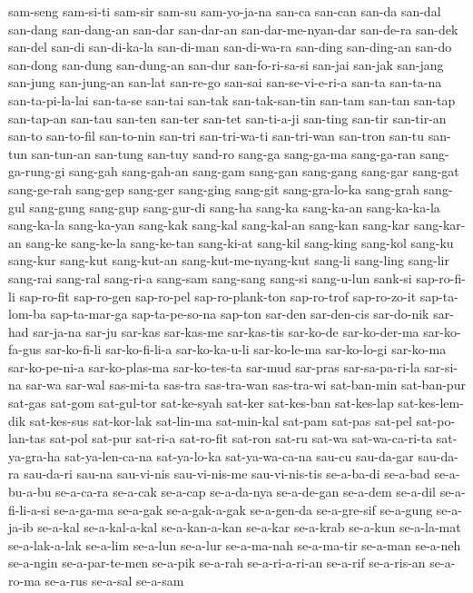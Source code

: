 {sam-seng sam-si-ti sam-sir sam-su sam-yo-ja-na san-ca san-can san-da
san-dal san-dang san-dang-an san-dar san-dar-an san-dar-me-nyan-dar
san-de-ra san-dek san-del san-di san-di-ka-la san-di-man san-di-wa-ra
san-ding san-ding-an san-do san-dong san-dung san-dung-an san-dur
san-fo-ri-sa-si san-jai san-jak san-jang san-jung san-jung-an san-lat
san-re-go san-sai san-se-vi-e-ri-a san-ta san-ta-na san-ta-pi-la-lai
san-ta-se san-tai san-tak san-tak-san-tin san-tam san-tan san-tap
san-tap-an san-tau san-ten san-ter san-tet san-ti-a-ji san-ting san-tir
san-tir-an san-to san-to-fil san-to-nin san-tri san-tri-wa-ti san-tri-wan
san-tron san-tu san-tun san-tun-an san-tung san-tuy sand-ro sang-ga
sang-ga-ma sang-ga-ran sang-ga-rung-gi sang-gah sang-gah-an sang-gam
sang-gan sang-gang sang-gar sang-gat sang-ge-rah sang-gep sang-ger
sang-ging sang-git sang-gra-lo-ka sang-grah sang-gul sang-gung sang-gup
sang-gur-di sang-ha sang-ka sang-ka-an sang-ka-ka-la sang-ka-la
sang-ka-yan sang-kak sang-kal sang-kal-an sang-kan sang-kar sang-kar-an
sang-ke sang-ke-la sang-ke-tan sang-ki-at sang-kil sang-king sang-kol
sang-ku sang-kur sang-kut sang-kut-an sang-kut-me-nyang-kut sang-li
sang-ling sang-lir sang-rai sang-ral sang-ri-a sang-sam sang-sang sang-si
sang-u-lun sank-si sap-ro-fi-li sap-ro-fit sap-ro-gen sap-ro-pel
sap-ro-plank-ton sap-ro-trof sap-ro-zo-it sap-ta-lom-ba sap-ta-mar-ga
sap-ta-pe-so-na sap-ton sar-den sar-den-cis sar-do-nik sar-had sar-ja-na
sar-ju sar-kas sar-kas-me sar-kas-tis sar-ko-de sar-ko-der-ma
sar-ko-fa-gus sar-ko-fi-li sar-ko-fi-li-a sar-ko-ka-u-li sar-ko-le-ma
sar-ko-lo-gi sar-ko-ma sar-ko-pe-ni-a sar-ko-plas-ma sar-ko-tes-ta sar-mud
sar-pras sar-sa-pa-ri-la sar-si-na sar-wa sar-wal sas-mi-ta sas-tra
sas-tra-wan sas-tra-wi sat-ban-min sat-ban-pur sat-gas sat-gom sat-gul-tor
sat-ke-syah sat-ker sat-kes-ban sat-kes-lap sat-kes-lem-dik sat-kes-sus
sat-kor-lak sat-lin-ma sat-min-kal sat-pam sat-pas sat-pel sat-po-lan-tas
sat-pol sat-pur sat-ri-a sat-ro-fit sat-ron sat-ru sat-wa sat-wa-ca-ri-ta
sat-ya-gra-ha sat-ya-len-ca-na sat-ya-lo-ka sat-ya-wa-ca-na sau-cu
sau-da-gar sau-da-ra sau-da-ri sau-na sau-vi-nis sau-vi-nis-me
sau-vi-nis-tis se-a-ba-di se-a-bad se-a-bu-a-bu se-a-ca-ra se-a-cak
se-a-cap se-a-da-nya se-a-de-gan se-a-dem se-a-dil se-a-fi-li-a-si
se-a-ga-ma se-a-gak se-a-gak-a-gak se-a-gen-da se-a-gre-sif se-a-gung
se-a-ja-ib se-a-kal se-a-kal-a-kal se-a-kan-a-kan se-a-kar se-a-krab
se-a-kun se-a-la-mat se-a-lak-a-lak se-a-lim se-a-lun se-a-lur se-a-ma-nah
se-a-ma-tir se-a-man se-a-neh se-a-ngin se-a-par-te-men se-a-pik se-a-rah
se-a-ri-a-ri-an se-a-rif se-a-ris-an se-a-ro-ma se-a-rus se-a-sal se-a-sam
}
